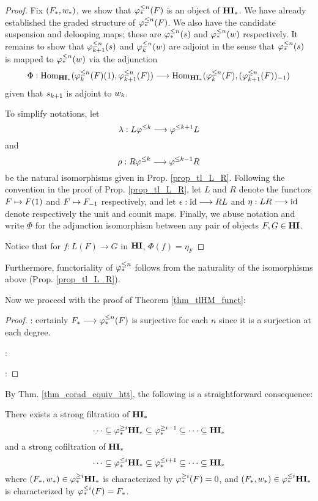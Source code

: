\begin{proof}
Fix $(F_*, \deloop_*)$, we show that $\tlHM{n}(F)$ is an object of
$\HM$. We have already established the graded structure of 
$\tlHM{n}(F)$. We also have the candidate suspension and delooping
maps; these are $\suspTL{n}$ and $\deloopTL{n}$ respectively. It
remains to show that $\suspTL[k + 1]{n}$ and $\deloopTL[k]{n}$ are 
adjoint in the sense that $\suspTL{n}$ is mapped to $\deloopTL{n}$ 
via the adjunction 
\[
\Phi: \homHM(\LHI{\tlHM[k]{n}(F)}, \tlHM[k + 1]{n}(F))
\to \homHM(\tlHM[k]{n}(F), \RHI{(\tlHM[k + 1]{n}(F))})
\]
given that $\susp_{k + 1}$ is adjoint to $\deloop_k$.

To simplify notations, let
\[
\lambda : L\tlHI{k} \to \tlHI{k + 1}L
\]
and 
\[
\rho : R\tlHI{k} \to \tlHI{k - 1}R
\]
be the natural isomorphisms given in Prop. \ref{prop_tl_L_R}. 
Following the convention in the proof of Prop. \ref{prop_tl_L_R}, 
let $L$ and $R$ denote the functors $F \mapsto \LHI{F}$ and $F 
\mapsto \RHI{F}$ respectively, and let $\epsilon : \id \to RL$ and 
$\eta: LR \to \id$ denote respectively the unit and counit maps.
Finally, we abuse notation and write $\Phi$ for the adjunction
isomorphism between any pair of objects $F, G \in \HI$.

Notice that for $f: L(F) \to G$ in $\HI$, $\Phi(f) = \eta_F$

\end{proof}

Furthermore, functoriality of $\tlHM{n}$ follows from the 
naturality of the isomorphisms above (Prop. \ref{prop_tl_L_R}).

Now we proceed with the proof of Theorem \ref{thm_tlHM_funct}:

\begin{proof}

 : certainly
$F_* \to \tlHM{n}(F)$ is surjective for each $n$ since it is
a surjection at each degree.

 :

 :
\end{proof}

By Thm. \ref{thm_corad_equiv_htt}, the following is a 
straightforward consequence:

\begin{cor}
There exists a strong filtration of $\HM$
\[
\cdots \subseteq \tgHM{i}\HM \subseteq \tgHM{i - 1} \subseteq 
   \cdots \subseteq \HM
\]
and a strong cofiltration of $\HM$
\[
\cdots \subseteq \tlHM{i}\HM \subseteq \tlHM{i + 1} \subseteq 
   \cdots \subseteq \HM
\]
where $(F_*, \deloop_*) \in \tgHM{i}\HM$ is characterized by
$\tgHM{i}(F) = 0$, and $(F_*, \deloop_*) \in \tlHM{i}\HM$ is
characterized by $\tlHM{i}(F) = F_*$.
\end{cor}

